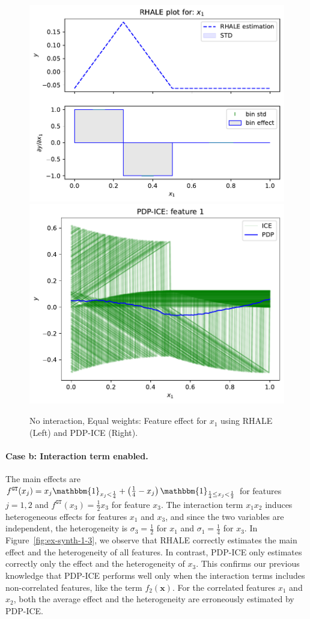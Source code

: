 \documentclass{ecai}  %
\newcommand{\xb}{\mathbf{x}}
\newcommand{\paragraphb}{\vspace{-0.25cm}\paragraph}
\begin{document}
\begin{figure}[h]
  \centering
  \includegraphics[width=.23\textwidth]{example_1/dale_feat_0}
  \includegraphics[width=.23\textwidth]{example_1/pdp_ice_feat_0}
  \caption{No interaction, Equal weights: Feature effect for \(x_1\)
    using RHALE (Left) and PDP-ICE (Right).}
  \label{fig:synth-ex-1-case-1}
\end{figure}

\paragraphb{Case b: Interaction term enabled.}
The main effects are
\(f^{\mathtt{GT}}(x_j) = x_j \mathbbm{1}_{x_j < \frac{1}{4}} +
\left(\frac{1}{4} - x_j\right) \mathbbm{1}_{\frac{1}{4} \leq x_j <
  \frac{1}{2}}\) for features $j=1,2$ and
\(f^{\mathtt{GT}}(x_3) = \frac{1}{2} x_3\) for feature $x_3$.  The
interaction term $x_1 x_2$ induces heterogeneous effects for features
$x_1$ and $x_3$, and since the two variables are independent, the
heterogeneity is \(\sigma_3 = \frac{1}{2}\) for $x_1$ and
\(\sigma_1 = \frac{1}{4}\) for $x_3$.  In
Figure~\ref{fig:ex-synth-1-3}, we observe that RHALE correctly
estimates the main effect and the heterogeneity of all features. In
contrast, PDP-ICE only estimates correctly only the effect and the
heterogeneity of $x_3$. This confirms our previous knowledge that
PDP-ICE performs well only when the interaction terms includes
non-correlated features, like the term \(f_2(\xb)\). For the
correlated features $x_1$ and $x_2$, both the average effect and the
heterogeneity are erroneously estimated by PDP-ICE.
\end{document}
